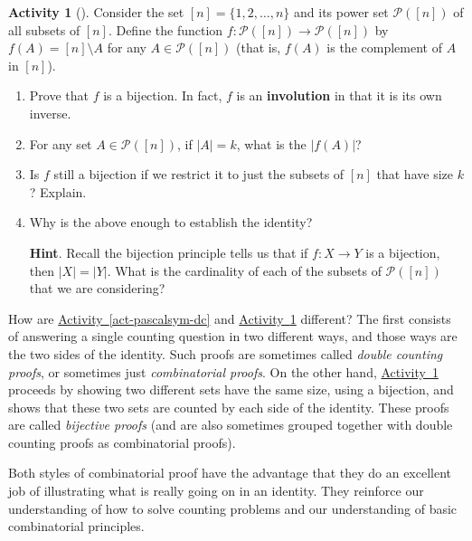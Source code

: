 \documentclass[10pt,]{book}
\newcommand{\terminology}[1]{\textbf{#1}}
\theoremstyle{plain}
\theoremstyle{definition}
\theoremstyle{definition}
\theoremstyle{definition}
\newtheorem{activity}[project]{Activity}
\theoremstyle{definition}
\numberwithin{equation}{chapter}
\def\pow{\mathcal P}
\newcommand{\card}[1]{\left| #1 \right|}
\begin{document}
\begin{activity}[]\label{act-pascalsym-bij}
\hypertarget{p-470}{}%
Consider the set \([n] = \{1,2,\ldots,n\}\) and its power set \(\pow([n])\) of all subsets of \([n]\).  Define the function \(f:\pow([n]) \to \pow([n])\) by \(f(A) = [n]\setminus A\) for any \(A \in \pow([n])\) (that is, \(f(A)\) is the complement of \(A\) in \([n]\)).%
\begin{enumerate}[font=\bfseries,label=(\alph*),ref=\alph*]
\item\label{task-36} \hypertarget{p-471}{}%
Prove that \(f\) is a bijection.  In fact, \(f\) is an \terminology{involution} in that it is its own inverse.%
\item\label{task-37} \hypertarget{p-472}{}%
For any set \(A \in \pow([n])\), if \(\card{A} = k\), what is the \(\card{f(A)}\)?%
\item\label{task-38} \hypertarget{p-473}{}%
Is \(f\) still a bijection if we restrict it to just the subsets of \([n]\) that have size \(k\)?  Explain.%
\item\label{task-39} \hypertarget{p-474}{}%
Why is the above enough to establish the identity?%
\par\smallskip%
\noindent\textbf{Hint}.\hypertarget{hint-8}{}\quad%
\hypertarget{p-475}{}%
Recall the bijection principle tells us that if \(f:X \to Y\) is a bijection, then \(\card{X} = \card{Y}\).  What is the cardinality of each of the subsets of \(\pow([n])\) that we are considering?%
\end{enumerate}
\end{activity}
\hypertarget{p-476}{}%
How are \hyperref[act-pascalsym-dc]{Activity~\ref{act-pascalsym-dc}} and \hyperref[act-pascalsym-bij]{Activity~\ref{act-pascalsym-bij}} different?  The first consists of answering a single counting question in two different ways, and those ways are the two sides of the identity.  Such proofs are sometimes called \emph{double counting proofs}, or sometimes just \emph{combinatorial proofs}.  On the other hand, \hyperref[act-pascalsym-bij]{Activity~\ref{act-pascalsym-bij}} proceeds by showing two different sets have the same size, using a bijection, and shows that these two sets are counted by each side of the identity.  These proofs are called \emph{bijective proofs} (and are also sometimes grouped together with double counting proofs as combinatorial proofs).%
\par
\hypertarget{p-477}{}%
Both styles of combinatorial proof have the advantage that they do an excellent job of illustrating what is really going on in an identity.  They reinforce our understanding of how to solve counting problems and our understanding of basic combinatorial principles.%
\end{document}
